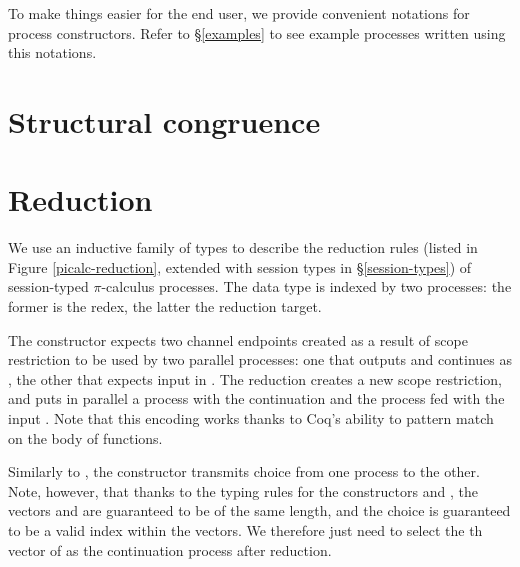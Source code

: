 \documentclass{mproj}
\newcommand{\picalc}{$\pi$-calculus}
\begin{document}

To make things easier for the end user, we provide convenient notations for process constructors. Refer to \S \ref{examples} to see example processes written using this notations.


\section{Structural congruence}\label{structural-congruence}

\section{Reduction}\label{reduction}

We use an inductive family of types to describe the reduction rules (listed in Figure \ref{picalc-reduction}, extended with session types in \S \ref{session-types}) of session-typed \picalc{} processes. The data type is indexed by two processes: the former is the redex, the latter the reduction target. 


The  constructor expects two channel endpoints created as a result of scope restriction to be used by two parallel processes: one that outputs  and continues as , the other that expects input in . The reduction creates a new scope restriction, and puts in parallel a process with the continuation  and the process  fed with the input . Note that this encoding works thanks to Coq's ability to pattern match on the body of functions.


Similarly to , the  constructor transmits choice from one process to the other. Note, however, that thanks to the typing rules for the constructors  and , the vectors  and  are guaranteed to be of the same length, and the choice  is guaranteed to be a valid index within the vectors. We therefore just need to select the th vector of  as the continuation process after reduction.

\end{document}
